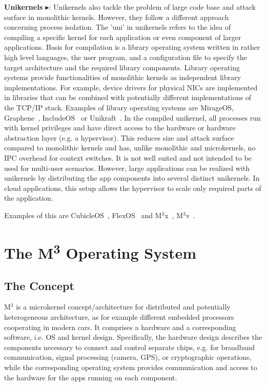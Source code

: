 \textbf{Unikernels\cite{madhavapeddy2014unikernels} $\blacktriangleright$}: Unikernels also tackle the problem of large code base and attack surface in monolithic kernels. However, they follow a different approach concerning process isolation. The 'uni' in unikernels refers to the idea of compiling a specific kernel for each application or even component of larger applications. Basis for compilation is a library operating system written in rather high level languages, the user program, and a configuration file to specify the target architecture and the required library components. Library operating systems provide functionalities of monolithic kernels as independent library implementations. For example, device drivers for physical NICs are implemented in libraries that can be combined with potentially different implementations of the TCP/IP stack. Examples of library operating systems are  MirageOS\cite{madhavapeddy2013unikernels}, Graphene~\cite{tsai2014Graphene}, IncludeOS~\cite{bratterud2015includeos} or Unikraft~\cite{kuenzer2021unikraft}.
In the compiled unikernel, all processes run with kernel privileges and have direct access to the hardware or hardware abstraction layer (e.g. a hypervisor). This reduces size and attack surface compared to monolithic kernels and has, unlike monolithic and microkernels, no IPC overhead for context switches. 
It is not well suited and not intended to be used for multi-user scenarios. However, large applications can be realized with unikernels by distributing the app components into several distinct unikernels. In cloud applications, this setup allows the hypervisor to scale only required parts of the application. 

Examples of this are CubicleOS~\cite{sartakov2021cubicleos}, FlexOS~\cite{lefeuvre2021flexos} and M$^3$x~\cite{Asmussen:M3x}, M$^3$v~\cite{Asmussen:M3v}.


\section{The M\textsuperscript{3} Operating System}
\subsection{The Concept}
M$^3$\cite{Asmussen:M3x} is a microkernel concept/architecture for distributed and potentially heterogeneous architecture, as for example different embedded processors cooperating in modern cars. It comprises a hardware and a corresponding software, i.e. OS and kernel design. Specifically, the hardware design describes the components necessary to connect and control separate chips, e.g. for broadband communication, signal processing (camera, GPS), or cryptographic operations, while the corresponding operating system provides communication and access to the hardware for the apps running on each component.

